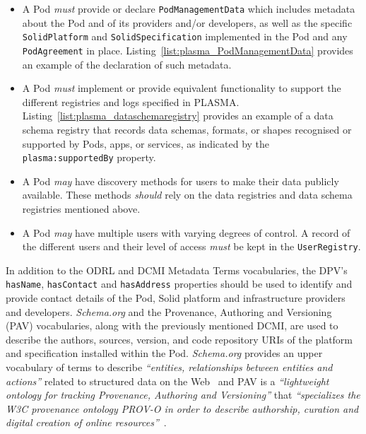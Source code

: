 \begin{itemize}
    \item A Pod \textit{must} provide or declare \texttt{PodManagementData} which includes metadata about the Pod and of its providers and/or developers, as well as the specific \texttt{SolidPlatform} and \texttt{SolidSpecification} implemented in the Pod and any \texttt{PodAgreement} in place. Listing~\ref{list:plasma_PodManagementData} provides an example of the declaration of such metadata.
    \item A Pod \textit{must} implement or provide equivalent functionality to support the different registries and logs specified in PLASMA. Listing~\ref{list:plasma_dataschemaregistry} provides an example of a data schema registry that records data schemas, formats, or shapes recognised or supported by Pods, apps, or services, as indicated by the \texttt{plasma:supportedBy} property.
    \item A Pod \textit{may} have discovery methods for users to make their data publicly available. These methods \textit{should} rely on the data registries and data schema registries mentioned above.
    \item A Pod \textit{may} have multiple users with varying degrees of control. A record of the different users and their level of access \textit{must} be kept in the \texttt{UserRegistry}.
\end{itemize}

In addition to the ODRL and DCMI Metadata Terms vocabularies, the DPV's \texttt{hasName}, \texttt{hasContact} and \texttt{hasAddress} properties should be used to identify and provide contact details of the Pod, Solid platform and infrastructure providers and developers.
\textit{Schema.org} and the Provenance, Authoring and Versioning (PAV) vocabularies, along with the previously mentioned DCMI, are used to describe the authors, sources, version, and code repository URIs of the platform and specification installed within the Pod.
\textit{Schema.org} provides an upper vocabulary of terms to describe \textit{``entities, relationships between entities and actions''} related to structured data on the Web~\citep{guha_schemaorg_2015} and PAV is a \textit{``lightweight ontology for tracking Provenance, Authoring and Versioning''} that \textit{``specializes the W3C provenance ontology PROV-O in order to describe authorship, curation and digital creation of online resources''}~\citep{ciccarese_pav_2013}.

